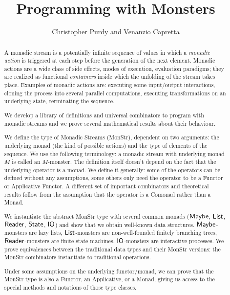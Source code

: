 \documentclass{article}
\title{Programming with Monsters}
\author{Christopher Purdy and Venanzio Capretta}
\begin{document}


\maketitle

\begin{abstract}
A monadic stream is a potentially infinite sequence of values in which a {\em monadic action} is triggered at each step before the generation of the next element.
Monadic actions are a wide class of side effects, modes of execution, evaluation paradigms; they are realized as functional {\em containers} inside which the unfolding of the stream takes place.
Examples of monadic actions are: executing some input/output interactions, cloning the process into several parallel computations, executing transformations on an underlying state, terminating the sequence.

We develop a library of definitions and universal combinators to program with monadic streams and we prove several mathematical results about their behaviour.

We define the type of Monadic Streams (MonStr), dependent on two arguments: the underlying monad (the kind of possible actions) and the type of elements of the sequence.
We use the following terminology: a monadic stream with underlying monad $M$ is called an $M$-monster.
The definition itself doesn't depend on the fact that the underlying operator is a monad.
We define it generally: some of the operators can be defined without any assumptions, some others only need the operator to be a Functor or Applicative Functor.
A different set of important combinators and theoretical results follow from the assumption that the operator is a Comonad rather than a Monad.

We instantiate the abstract MonStr type with several common monads ($\mathsf{Maybe}$, $\mathsf{List}$, $\mathsf{Reader}$, $\mathsf{State}$, $\mathsf{IO}$) and show that we obtain well-known data structures.
$\mathsf{Maybe}$-monsters are lazy lists, $\mathsf{List}$-monsters are non-well-founded finitely branching trees, $\mathsf{Reader}$-monsters are finite state machines, $\mathsf{IO}$-monsters are interactive processes.
We prove equivalences between the traditional data types and their MonStr versions: the MonStr combinators instantiate to traditional operations.

Under some assumptions on the underlying functor/monad, we can prove that the MonStr type is also a Functor, an Applicative, or a Monad, giving us access to the special methods and notations of those type classes.
\end{abstract}


















\end{document}
